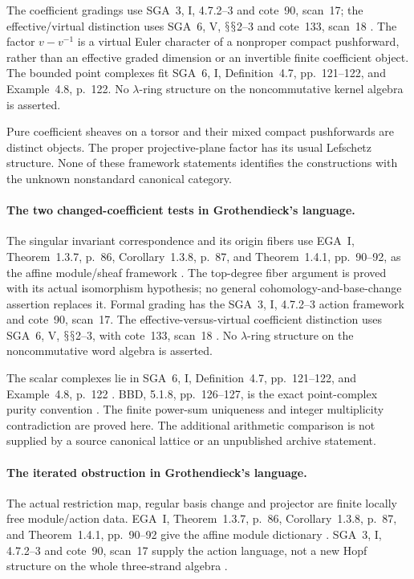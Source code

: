 \documentclass[11pt,a4paper]{article}
\renewcommand{\S}{\ensuremath{\mathsection}}
\theoremstyle{named}\newtheorem{finding}{Finding}[section]
\theoremstyle{definition}\newtheorem{definition}[finding]{Definition}
\theoremstyle{remark}\newtheorem{remark}[finding]{Remark}
\begin{document}
The coefficient gradings use SGA~3, I, 4.7.2--3 and
cote~90, scan~17; the effective/virtual distinction uses
SGA~6, V, \S\S2--3 and cote~133, scan~18
\cite{SGA3,SGA6,Archive}.
The factor \(v-v^{-1}\) is a virtual Euler character
of a nonproper compact pushforward, rather than an
effective graded dimension or an invertible finite
coefficient object. The bounded point complexes fit
SGA~6, I, Definition~4.7, pp.~121--122, and
Example~4.8, p.~122.
No \(\lambda\)-ring structure on the noncommutative
kernel algebra is asserted.

Pure coefficient sheaves on a torsor and their mixed
compact pushforwards are distinct objects. The proper
projective-plane factor has its usual Lefschetz
structure. None of these framework statements identifies
the constructions with the unknown nonstandard canonical
category.

\paragraph{The two changed-coefficient tests in Grothendieck's language.}
The singular invariant correspondence and its origin
fibers use EGA~I, Theorem~1.3.7, p.~86,
Corollary~1.3.8, p.~87, and Theorem~1.4.1,
pp.~90--92, as the affine module/sheaf framework
\cite{EGA}. The top-degree fiber argument is proved
with its actual isomorphism hypothesis; no general
cohomology-and-base-change assertion replaces it.
Formal grading has the SGA~3, I, 4.7.2--3 action
framework and cote~90, scan~17. The effective-versus-virtual
coefficient distinction uses SGA~6, V, \S\S2--3,
with cote~133, scan~18 \cite{SGA3,SGA6,Archive}.
No \(\lambda\)-ring structure on the noncommutative
word algebra is asserted.

The scalar complexes lie in SGA~6, I,
Definition~4.7, pp.~121--122, and Example~4.8,
p.~122 \cite{SGA6}. BBD, 5.1.8, pp.~126--127,
is the exact point-complex purity convention
\cite{BBD}. The finite power-sum uniqueness and
integer multiplicity contradiction are proved here.
The additional arithmetic comparison is not supplied
by a source canonical lattice or an unpublished
archive statement.

\paragraph{The iterated obstruction in Grothendieck's language.}
The actual restriction map, regular basis change and
projector are finite locally free module/action data.
EGA~I, Theorem~1.3.7, p.~86, Corollary~1.3.8, p.~87,
and Theorem~1.4.1, pp.~90--92 give the affine module
dictionary \cite{EGA}.
SGA~3, I, 4.7.2--3 and cote~90, scan~17 supply the
action language, not a new Hopf structure on the whole
three-strand algebra \cite{SGA3,Archive}.
\end{document}
